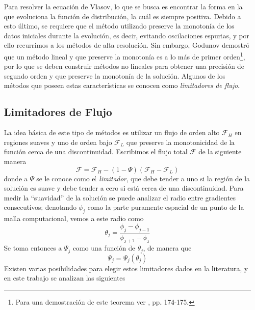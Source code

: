 \documentclass[11pt,twoside,openright,spanish]{report}
\numberwithin{equation}{chapter}
\numberwithin{figure}{chapter}
\numberwithin{table}{chapter}
\begin{document}
Para resolver la ecuación de Vlasov, lo que se busca es encontrar la forma en la que evoluciona la función de distribución, la cuál es siempre positiva. Debido a esto último, se requiere que el método utilizado preserve la monotonía de los datos iniciales durante la evolución, es decir, evitando oscilaciones espurias, y por ello recurrimos a los métodos de alta resolución. Sin embargo, Godunov demostró que un método lineal y que preserve la monotonía es a lo más de primer orden\footnote{Para una demostración de este teorema ver \citet{levequenmcl}, pp. 174-175.}, por lo que se deben construir métodos no lineales para obtener una precisión de segundo orden y que preserve la monotonía de la solución. Algunos de los métodos que poseen estas características se conocen como \textit{limitadores de flujo}.

\subsection{Limitadores de Flujo}\label{limflujo}
\noindent
La idea básica de este tipo de métodos es utilizar un flujo de orden alto $\mathcal{F}_H$ en regiones suaves y uno de orden bajo $\mathcal{F}_L$ que preserve la monotonicidad de la función cerca de una discontinuidad. Escribimos el flujo total $\mathcal{F}$ de la siguiente manera
\begin{equation}
\mathcal{F}=\mathcal{F}_H-\left(1-\Psi\right)\left(\mathcal{F}_H-\mathcal{F}_L\right)
\label{flujototal}
\end{equation}
donde a $\Psi$ se le conoce como el \textit{limitador}, que debe tender a uno si la región de la solución es suave y debe tender a cero si está cerca de una discontinuidad. Para medir la ``suavidad'' de la solución se puede analizar el radio entre gradientes consecutivos; denotando $\phi_j$ como la parte puramente espacial de un punto de la malla computacional, vemos a este radio como
\begin{equation}
\theta_j=\frac{\phi_j-\phi_{j-1}}{\phi_{j+1}-\phi_j}
\end{equation}
Se toma entonces a $\Psi_j$ como una función de $\theta_j$, de manera que
\begin{equation}
\Psi_j=\Psi_j\left(\theta_j\right)
\end{equation} 
Existen varias posibilidades para elegir estos limitadores dados en la literatura, y en este trabajo se analizan las siguientes
\end{document}
